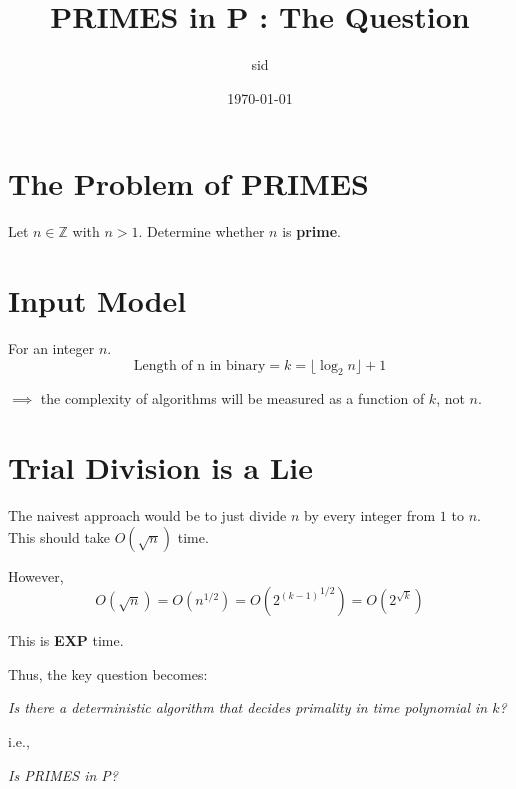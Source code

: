 \documentclass{article}
\title{PRIMES in P : The Question}
\author{sid}
\date{\today}
\begin{document}
\maketitle

\section{The Problem of PRIMES}

Let $n \in \mathbb{Z}$ with $n > 1$. Determine whether $n$ is \textbf{prime}.

\section{Input Model}

For an integer $n$.
\[
\text{Length of n in binary} = k = \lfloor \log_2 n \rfloor + 1
\]

$\implies$ the complexity of algorithms will be measured as a function of $k$, not $n$.

\section{Trial Division is a Lie}

The naivest approach would be to just divide $n$ by every integer from $1$ to $n$.
This should take $O(\sqrt{n})$ time.

However,
$$
O(\sqrt{n})=O(n^{1/2})=O({2^{(k-1)}}^{1/2})=O(2^{\sqrt{k}})
$$

This is \textbf{EXP} time.

Thus, the key question becomes:

\begin{center}
\textit{Is there a deterministic algorithm that decides primality in time polynomial in $k$?}
\end{center}
i.e.,
\begin{center}
\textit{Is PRIMES in P?}
\end{center}
\end{document}
